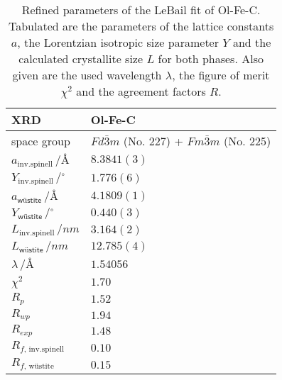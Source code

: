 \documentclass[\main/dresen_thesis.tex]{subfiles}
\begin{document}
  \begin{table}[ht]
    \centering
    \caption{\label{tab:colloidalCrystals:nanoparticle:discussion:xrdLeBail}Refined parameters of the LeBail fit of Ol-Fe-C. Tabulated are the parameters of the lattice constants $a$, the Lorentzian isotropic size parameter $Y$ and the calculated crystallite size $L$ for both phases. Also given are the used wavelength $\lambda$, the figure of merit $\chi^2$ and the agreement factors $R$.}
    \begin{tabular}{ l | l }
      \hline
      \rule{0pt}{2ex} \textbf{XRD} & \textbf{Ol-Fe-C}\\
      \hline
      \hline
      \rule{0pt}{2ex}space group & $Fd\bar{3}m$ (No. 227) + $Fm\bar{3}m$ (No. 225)\\
      \hline
      \rule{0pt}{2ex} $a_\mathrm{inv. spinell} \,/ \unit{\angstrom}$         &  $8.3841(3)$  \\
      \rule{0pt}{2ex} $Y_\mathrm{inv. spinell} \,/ \unit{^\circ}$            &  $1.776 (6)$   \\
      \rule{0pt}{2ex} $a_\textsf{w\"ustite}     \,/ \unit{\angstrom}$        &  $4.1809(1)$  \\
      \rule{0pt}{2ex} $Y_\textsf{w\"ustite}     \,/ \unit{^\circ}$           &  $0.440(3)$   \\
      \hline
      \rule{0pt}{2ex} $L_\mathrm{inv. spinell} \,/ \unit{nm}$                &  $3.164(2)$ \\
      \rule{0pt}{2ex} $L_\textsf{w\"ustite}      \,/ \unit{nm}$              &  $12.785(4)$ \\
      \hline
      \rule{0pt}{2ex} $\lambda \,/ \unit{\angstrom}$                         &  $1.54056$\\
      \hline
      \rule{0pt}{2ex} $\chi^2$                                               &  $1.70$ \\
      \rule{0pt}{2ex} $R_p$                                                  &  $1.52$ \\
      \rule{0pt}{2ex} $R_{wp}$                                               &  $1.94$ \\
      \rule{0pt}{2ex} $R_{exp}$                                              &  $1.48$ \\
      \rule{0pt}{2ex} $R_{f, \, \mathrm{inv. spinell}}$                      &  $0.10$ \\
      \rule{0pt}{2ex} $R_{f, \, \text{w\"ustite}}$                           &  $0.15$ \\
      \hline
    \end{tabular}
  \end{table}
\end{document}
